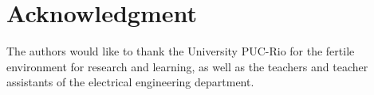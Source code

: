 \documentclass[a4paper]{IEEEtran}
\begin{document}


\section*{Acknowledgment}
The authors would like to thank the University PUC-Rio for the fertile environment for research and learning, as well as the teachers and teacher assistants of the electrical engineering department.


\ifCLASSOPTIONcaptionsoff
  \newpage
\fi






%
%
%
%


% 
%
\end{document}
